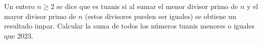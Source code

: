 Un entero $n\geq 2$ se dice que es tuanis si al sumar el menor divisor primo de $n$ y el mayor divisor primo de $n$ (estos divisores pueden ser iguales) se obtiene un resultado impar. Calcular la suma de todos los números tuanis menores o iguales que $2023.$